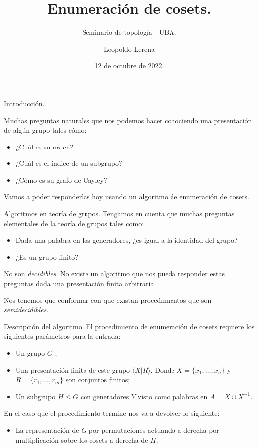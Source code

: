 \documentclass[aspectratio=169, 9pt]{beamer}
\title{Enumeración de cosets.}
\subtitle{Seminario de topología - UBA.}
\date{12 de octubre de 2022.}
\author{Leopoldo Lerena}
\institute{Universidad de Buenos Aires}
\begin{document}
\maketitle

\begin{frame}[fragile]{Introducción.}


Muchas preguntas naturales que nos podemos hacer conociendo una presentación de algún grupo tales cómo:

\begin{itemize}
	\item ¿Cuál es su orden?
	\pause
	\item ¿Cuál es 	el índice de un subgrupo?
	\pause
	\item ¿Cómo es su grafo de Cayley?
	\pause
\end{itemize}

Vamos a poder responderlas hoy usando un algoritmo de enumeración de cosets.
\end{frame}

\begin{frame}[fragile]{Algoritmos en teoría de grupos.}
	Tengamos en cuenta que muchas preguntas elementales de la teoría de grupos tales como:
	\begin{itemize}
		\item Dada una palabra en los generadores, ¿es igual a la identidad del grupo?
		\pause
		\item ¿Es un grupo finito?
	\end{itemize}
	\pause
	No son \textit{decidibles}. 
	No existe un algoritmo que nos pueda responder estas preguntas dada una presentación finita arbitraria.
	\medskip
	
	\pause
	
	
	Nos tenemos que conformar con que existan procedimientos que son \textit{semidecidibles}. 
\end{frame}

\begin{frame}[fragile]{Descripción del algoritmo.}
	El procedimiento de enumeración de cosets requiere los siguientes parámetros para la entrada:
	\begin{itemize}
		\item Un grupo $G$ \fp;
		\pause
		\item Una presentación finita de este grupo $\langle X | R \rangle$.
			Donde $X = \{ x_1, \dots, x_n \}$ y $R = \{ r_1, \dots, r_m \}$ son conjuntos finitos;
 		\pause
		\item Un subgrupo $H \le G$  \fg con generadores $Y$ visto como palabras en $A = X \cup X^{-1}$.
	\end{itemize}
	\pause
	\medskip
	
	En el caso que el procedimiento termine nos va a devolver lo siguiente:
	\pause
	\begin{itemize}
		\item La representación de $G$ por permutaciones actuando a derecha por multiplicación sobre los cosets a derecha de $H$.
	\end{itemize}  
\end{frame}
\end{document}
